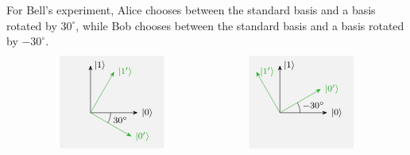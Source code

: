 




For Bell's experiment, Alice chooses between the standard basis and a basis rotated by $30^\circ$, while Bob chooses between the standard basis and a basis rotated by $-30^\circ$.
\[
\begin{tikzpicture}[x=1cm, y=1cm, scale=0.75, font=\footnotesize]
  \definecolor{basisstatecolor}{HTML}{\eat #20a61e}

  \foreach \panel/\xshift/\basisangle in {L/-4/30,R/4/-30}{
    \begin{scope}[shift={(\xshift,0)}]

      \pgfmathsetmacro{\halfwidth}{2.2}
      \pgfmathsetmacro{\graysquaretop}{2.2}

      \coordinate (\panel-tl) at (-\halfwidth,\graysquaretop);
      \coordinate (\panel-tr) at (\halfwidth,\graysquaretop);

      \fill[black!05, rounded corners=0.5pt] (-\halfwidth,-1.7) rectangle (\halfwidth,\graysquaretop);
      
      \begin{scope}[shift={(-0.9,-0.2)}]
      
      \draw[-Stealth, black] (0,0) -- (2.0,0) node[right] {$\ket{0}$};
      \draw[-Stealth, black] (0,0) -- (0,2.0) node[right] {$\ket{1}$};

      \draw[-Stealth, basisstatecolor] (0,0) -- ({2.0*cos(-\basisangle)},{2.0*sin(-\basisangle)}) node[ right] {$\ket{0'}$}; 
      \draw[-Stealth, basisstatecolor] (0,0) -- ({-2.0*sin(-\basisangle)},{2.0*cos(-\basisangle)}) node[ right] {$\ket{1'}$};

      \draw[black] (0.85,0) arc (0:-\basisangle:0.85) node[pos=0.7, right] {$\basisangle^\circ$};
      \end{scope}

    \end{scope}
  }



\end{tikzpicture}\]
